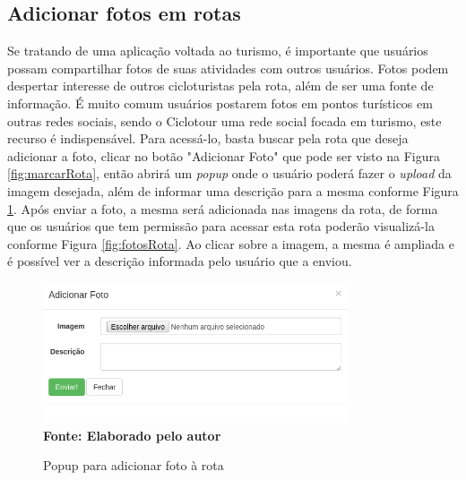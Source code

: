 \subsection{Adicionar fotos em rotas}
Se tratando de uma aplicação voltada ao turismo, é importante que usuários possam compartilhar fotos de suas atividades com outros usuários. Fotos 
podem despertar interesse de outros cicloturistas pela rota, além de ser uma fonte de informação. É muito comum usuários postarem fotos em pontos 
turísticos em outras redes sociais, sendo o Ciclotour uma rede social focada em turismo, este recurso é indispensável. Para acessá-lo, basta buscar
pela rota que deseja adicionar a foto, clicar no botão "Adicionar Foto" que pode ser visto na Figura \ref{fig:marcarRota}, então abrirá um 
\textit{popup} onde o usuário poderá fazer o \textit{upload} da imagem desejada, além de informar uma descrição para a mesma conforme Figura 
\ref{fig:adicionarFoto}. Após enviar a foto, a mesma será adicionada nas imagens da rota, de forma que os usuários que tem permissão para acessar 
esta rota poderão visualizá-la conforme Figura \ref{fig:fotosRota}. Ao clicar sobre a imagem, a mesma é ampliada e é possível ver a descrição 
informada pelo usuário que a enviou.

\begin{figure}[!ht]
	\centering	
	\caption[\hspace{0.1cm} Adicionar Foto.]
	{Popup para adicionar foto à rota}
	  \vspace{-0.4cm}
	\includegraphics[width=0.8\textwidth]{figuras/adicionarFoto.png}
	 \vspace{0cm}
	\\\textbf{\footnotesize Fonte: Elaborado pelo autor}
	\label{fig:adicionarFoto}
\end{figure}

